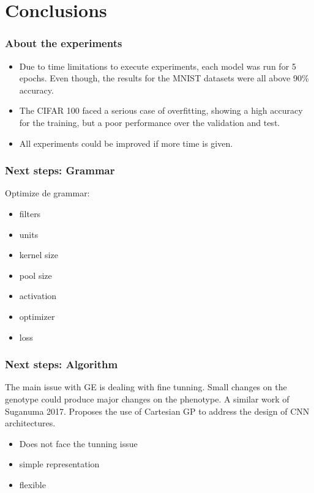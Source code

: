 \documentclass[aspectratio=169]{beamer}
\begin{document}
	\section{Conclusions}
		\begin{frame}
			\frametitle{About the experiments}
			
			\begin{itemize}
				\item Due to time limitations to execute experiments, each model was run for 5 epochs. Even though, the results for the MNIST datasets were all above 90\% accuracy.
				
				\item The CIFAR 100 faced a serious case of overfitting, showing a high accuracy for the training, but a poor performance over the validation and test.
				
				\item All experiments could be improved if more time is given.
			\end{itemize}
		
		\end{frame}
		\begin{frame}
			\frametitle{Next steps: Grammar}
			
			Optimize de grammar:
			\begin{itemize}
				\item filters
				\item units
				\item kernel size
				\item pool size
				\item activation
				\item optimizer
				\item loss
			\end{itemize}
		
		\end{frame}
		\begin{frame}
			\frametitle{Next steps: Algorithm}
			
			The main issue with GE is dealing with fine tunning. Small changes on the genotype could produce major changes on the phenotype. A similar work of Suganuma 2017. Proposes the use of Cartesian GP to address the design of CNN architectures.

			\begin{itemize}
				\item Does not face the tunning issue
				\item simple representation
				\item flexible
			\end{itemize}
		
		\end{frame}
		\frame{\acknowledgmentpage}
\end{document}
